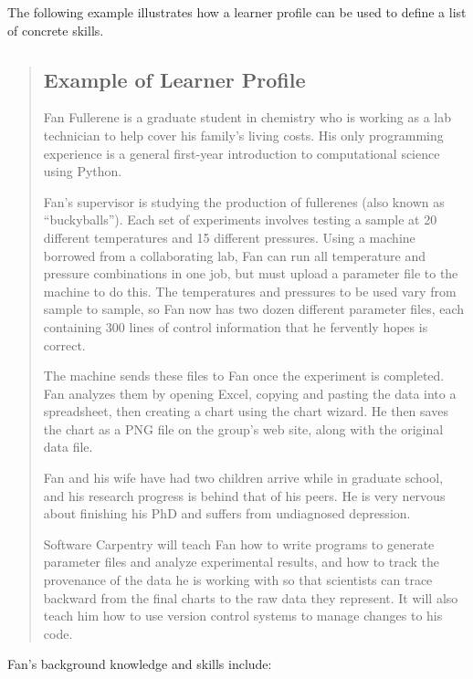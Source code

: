 \documentclass[
]{book}
\begin{document}
The following example illustrates how a learner profile can be used to define a list of
concrete skills.

\begin{quote}
\hypertarget{example-of-learner-profile}{%
\subsection*{Example of Learner Profile}\label{example-of-learner-profile}}

Fan Fullerene is a graduate student in chemistry who is working as a lab
technician to help cover his family's living costs. His only programming
experience is a general first-year introduction to computational science using
Python.

Fan's supervisor is studying the production of fullerenes (also known as
``buckyballs''). Each set of experiments involves testing a sample at 20
different temperatures and 15 different pressures. Using a machine borrowed
from a collaborating lab, Fan can run all temperature and pressure
combinations in one job, but must upload a parameter file to the machine to do
this. The temperatures and pressures to be used vary from sample to sample, so
Fan now has two dozen different parameter files, each containing 300 lines of
control information that he fervently hopes is correct.

The machine sends these files to Fan once the experiment is completed. Fan
analyzes them by opening Excel, copying and pasting the data into a
spreadsheet, then creating a chart using the chart wizard. He then saves the
chart as a PNG file on the group's web site, along with the original data
file.

Fan and his wife have had two children arrive while in graduate school, and
his research progress is behind that of his peers. He is very nervous about
finishing his PhD and suffers from undiagnosed depression.

Software Carpentry will teach Fan how to write programs to generate parameter
files and analyze experimental results, and how to track the provenance of the
data he is working with so that scientists can trace backward from the final
charts to the raw data they represent. It will also teach him how to use
version control systems to manage changes to his code.
\end{quote}

Fan's background knowledge and skills include:
\end{document}
